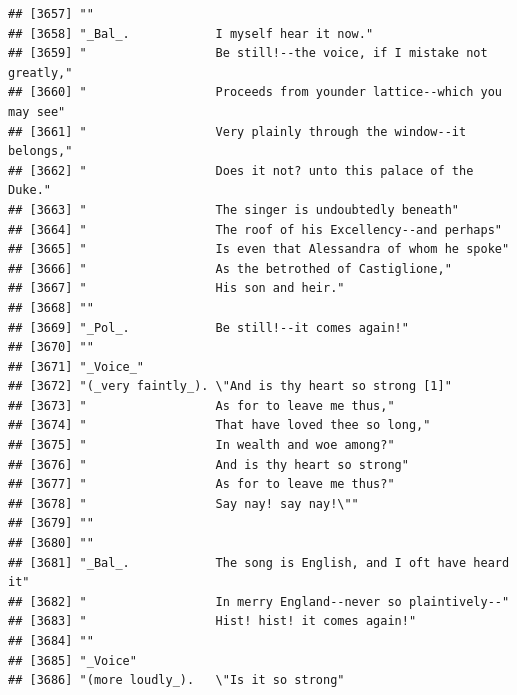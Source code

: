 \documentclass{article}\usepackage[]{graphicx}\usepackage[]{color}
\makeatletter
\newenvironment{kframe}{%
 \def\at@end@of@kframe{}%
 \ifinner\ifhmode%
  \def\at@end@of@kframe{\end{minipage}}%
  \begin{minipage}{\columnwidth}%
 \fi\fi%
 \def\FrameCommand##1{\hskip\@totalleftmargin \hskip-\fboxsep
 \colorbox{shadecolor}{##1}\hskip-\fboxsep
     \hskip-\linewidth \hskip-\@totalleftmargin \hskip\columnwidth}%
 \MakeFramed {\advance\hsize-\width
   \@totalleftmargin\z@ \linewidth\hsize
   \@setminipage}}%
 {\par\unskip\endMakeFramed%
 \at@end@of@kframe}
\newenvironment{knitrout}{}{} %
\makeatother
\begin{document}
\begin{knitrout}
\begin{kframe}
\begin{verbatim}
## [3657] ""                                                                            
## [3658] "_Bal_.            I myself hear it now."                                     
## [3659] "                  Be still!--the voice, if I mistake not greatly,"           
## [3660] "                  Proceeds from younder lattice--which you may see"          
## [3661] "                  Very plainly through the window--it belongs,"              
## [3662] "                  Does it not? unto this palace of the Duke."                
## [3663] "                  The singer is undoubtedly beneath"                         
## [3664] "                  The roof of his Excellency--and perhaps"                   
## [3665] "                  Is even that Alessandra of whom he spoke"                  
## [3666] "                  As the betrothed of Castiglione,"                          
## [3667] "                  His son and heir."                                         
## [3668] ""                                                                            
## [3669] "_Pol_.            Be still!--it comes again!"                                
## [3670] ""                                                                            
## [3671] "_Voice_"                                                                     
## [3672] "(_very faintly_). \"And is thy heart so strong [1]"                          
## [3673] "                  As for to leave me thus,"                                  
## [3674] "                  That have loved thee so long,"                             
## [3675] "                  In wealth and woe among?"                                  
## [3676] "                  And is thy heart so strong"                                
## [3677] "                  As for to leave me thus?"                                  
## [3678] "                  Say nay! say nay!\""                                       
## [3679] ""                                                                            
## [3680] ""                                                                            
## [3681] "_Bal_.            The song is English, and I oft have heard it"              
## [3682] "                  In merry England--never so plaintively--"                  
## [3683] "                  Hist! hist! it comes again!"                               
## [3684] ""                                                                            
## [3685] "_Voice"                                                                      
## [3686] "(more loudly_).   \"Is it so strong"                                         

\end{verbatim}
\end{kframe}
\end{knitrout}
\end{document}
